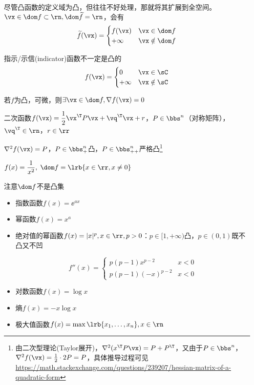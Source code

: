 \begin{definition}
尽管凸函数的定义域为凸，但往往不好处理，那就将其扩展到全空间。
$\vx\in\dom f\subset\rn, \dom\widetilde{f}=\rn$，会有
\[\widetilde{f}(\vx)=\begin{cases}f(\vx)&\vx\in\dom f\\+\infty&\vx\notin\dom f\end{cases}\]
\end{definition}

指示/示信(indicator)函数不一定是凸的
\[f(\vx)=\begin{cases}0&\vx\in \sC\\ +\infty & \vx\notin \sC\end{cases}\]

\begin{theorem}
若$f$为凸，可微，则$\exists \vx\in\dom f,\nabla f(\vx)=0$
\end{theorem}

\begin{example}
二次函数$f(\vx)=\dfrac{1}{2}\vx^\T P\vx+\vq^\T \vx+r$，$P\in \bbs^n$（对称矩阵），$\vq^\T\in\rn$，$r\in\rr$
\end{example}
\begin{analysis}
$\nabla^2 f(\vx)=P$，$P\in \bbs^n_+$凸，$P\in \bbs_{++}^n$严格凸\footnote{由二次型理论(Taylor展开)，$\nabla^2 (x^\T P\vx)=P+P^\T$，又由于$P\in\bbs^n$，$\nabla^2 f(\vx)=\frac{1}{2}\cdot 2P=P$，具体推导过程可见\url{https://math.stackexchange.com/questions/239207/hessian-matrix-of-a-quadratic-form}}
\end{analysis}

\begin{example}
$f(x)=\dfrac{1}{x^2},\;\dom f=\lrb{x\in\rr,x\ne 0}$
\end{example}
\begin{analysis}
注意$\dom f$不是凸集
\end{analysis}
\begin{itemize}
	\item 指数函数$f(x)=\ee^{ax}$
	\item 幂函数$f(x)=x^a$
	\item 绝对值的幂函数$f(x)=|x|^p,x\in\rr,p>0$：$p\in[1,+\infty)$凸，$p\in(0,1)$既不凸又不凹
	\begin{analysis}
	\[f''(x)=\begin{cases}
	p(p-1)x^{p-2} & x<0\\
	p(p-1)(-x)^{p-2} & x<0
	\end{cases}\]
	\end{analysis}
	\item 对数函数$f(x)=\log x$
	\item 熵$f(x)=-x\log x$
	\item 极大值函数$f(x)=\max\lrb{x_1,\ldots,x_n},x\in\rn$
\end{itemize}

